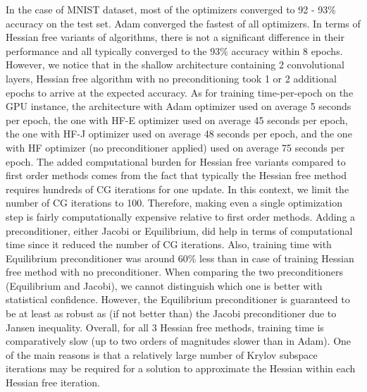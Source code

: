 \documentclass[10pt,twocolumn,letterpaper]{article}
\begin{document}
In the case of MNIST dataset, most of the optimizers converged to 92 - 93\% accuracy on the test set. Adam converged the fastest of all optimizers. In terms of Hessian free variants of algorithms, there is not a significant difference in their performance and all typically converged to the 93\% accuracy within 8 epochs. However, we notice that in the shallow architecture containing 2 convolutional layers, Hessian free algorithm with no preconditioning took 1 or 2 additional epochs to arrive at the expected accuracy. As for training time-per-epoch on the GPU instance, the architecture with Adam optimizer used on average 5 seconds per epoch, the one with HF-E optimizer used on average 45 seconds per epoch, the one with HF-J optimizer used on average 48 seconds per epoch, and the one with HF optimizer (no preconditioner applied) used on average 75 seconds per epoch. The added computational burden for Hessian free variants compared to first order methods comes from the fact that typically the Hessian free method requires hundreds of CG iterations for one update. In this context, we limit the number of CG iterations to 100. Therefore, making even a single optimization step is fairly computationally expensive relative to first order methods. Adding a preconditioner, either Jacobi or Equilibrium, did help in terms of computational time since it reduced the number of CG iterations. Also, training time with Equilibrium preconditioner was around 60\% less than in case of training Hessian free method with no preconditioner. When comparing the two preconditioners (Equilibrium and Jacobi), we cannot distinguish which one is better with statistical confidence. However, the Equilibrium preconditioner is guaranteed to be at least as robust as (if not better than) the Jacobi preconditioner due to Jansen inequality.
Overall, for all 3 Hessian free methods, training time is comparatively slow (up to two orders of magnitudes slower than in Adam). One of the main reasons is that a relatively large number of Krylov subspace iterations may be required for a solution to approximate the Hessian within each Hessian free iteration. 
\end{document}
